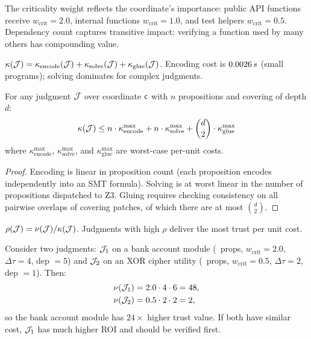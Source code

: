 \documentclass[11pt]{article}
\newcommand{\TrustValue}{\nu}
\newcommand{\VerifCost}{\kappa}
\newcommand{\TrustReturn}{\rho}
\begin{document}
The criticality weight reflects the coordinate's importance: public
API functions receive $w_{\text{crit}} = 2.0$, internal functions
$w_{\text{crit}} = 1.0$, and test helpers $w_{\text{crit}} = 0.5$.
Dependency count captures transitive impact: verifying a function
used by many others has compounding value.

\begin{definition}\label{def:verif-cost}
$\VerifCost(\J) = \kappa_{\text{encode}}(\J) +
\kappa_{\text{solve}}(\J) + \kappa_{\text{glue}}(\J)$.
Encoding cost is $0.0026\,s$ (small programs);
solving dominates for complex judgments.
\end{definition}

\begin{proposition}\label{prop:cost-decomp}
For any judgment $\mathcal{J}$ over coordinate $\mathsf{c}$ with $n$ propositions
and covering of depth $d$:
\[
  \VerifCost(\J) \leq n \cdot \kappa_{\mathrm{encode}}^{\max} +
  n \cdot \kappa_{\mathrm{solve}}^{\max} +
  \binom{d}{2} \cdot \kappa_{\mathrm{glue}}^{\max}
\]
where $\kappa_{\mathrm{encode}}^{\max}$, $\kappa_{\mathrm{solve}}^{\max}$,
and $\kappa_{\mathrm{glue}}^{\max}$ are worst-case per-unit costs.
\end{proposition}

\begin{proof}
Encoding is linear in proposition count (each proposition encodes
independently into an SMT formula).  Solving is at worst linear in
the number of propositions dispatched to Z3.  Gluing requires
checking consistency on all pairwise overlaps of covering patches,
of which there are at most $\binom{d}{2}$.
\end{proof}

\begin{definition}\label{def:trust-roi}
$\TrustReturn(\J) = \TrustValue(\J) / \VerifCost(\J)$.
Judgments with high $\TrustReturn$ deliver the most trust per unit cost.
\end{definition}

\begin{example}\label{ex:roi}
Consider two judgments: $\mathcal{J}_1$ on a bank account module (\ppLVbankaccountProps\
props, $w_{\text{crit}} = 2.0$, $\Delta\tau = 4$, dep $= 5$) and
$\mathcal{J}_2$ on an XOR cipher utility (\ppLVxorcipherProps\ props,
$w_{\text{crit}} = 0.5$, $\Delta\tau = 2$, dep $= 1$).  Then:
\begin{align*}
  \TrustValue(\J_1) &= 2.0 \cdot 4 \cdot 6 = 48, \\
  \TrustValue(\J_2) &= 0.5 \cdot 2 \cdot 2 = 2,
\end{align*}
so the bank account module has $24\times$ higher trust value.  If both have
similar cost, $\mathcal{J}_1$ has much higher ROI and should be verified first.
\end{example}
\end{document}
